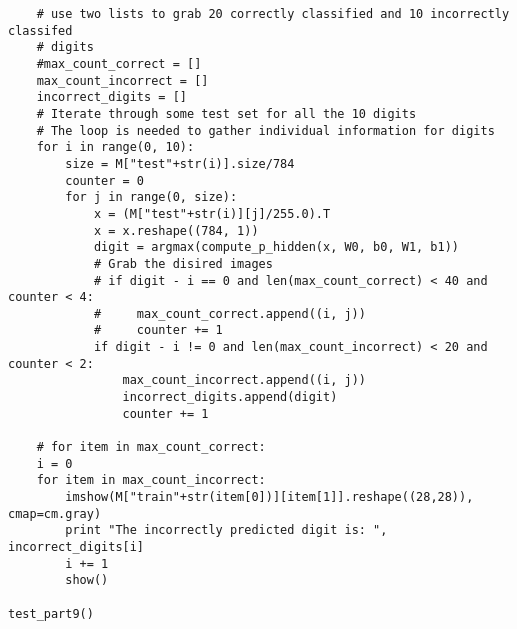 \documentclass{article}
\begin{document}
\begin{lstlisting}
    # use two lists to grab 20 correctly classified and 10 incorrectly classifed
    # digits
    #max_count_correct = []
    max_count_incorrect = []
    incorrect_digits = []
    # Iterate through some test set for all the 10 digits
    # The loop is needed to gather individual information for digits
    for i in range(0, 10):
        size = M["test"+str(i)].size/784
        counter = 0
        for j in range(0, size):
            x = (M["test"+str(i)][j]/255.0).T
            x = x.reshape((784, 1))
            digit = argmax(compute_p_hidden(x, W0, b0, W1, b1))
            # Grab the disired images
            # if digit - i == 0 and len(max_count_correct) < 40 and counter < 4:
            #     max_count_correct.append((i, j))
            #     counter += 1
            if digit - i != 0 and len(max_count_incorrect) < 20 and counter < 2:
                max_count_incorrect.append((i, j))
                incorrect_digits.append(digit)
                counter += 1

    # for item in max_count_correct:
    i = 0
    for item in max_count_incorrect:
        imshow(M["train"+str(item[0])][item[1]].reshape((28,28)), cmap=cm.gray)
        print "The incorrectly predicted digit is: ", incorrect_digits[i]
        i += 1
        show()

test_part9()
\end{lstlisting}
\end{document}
